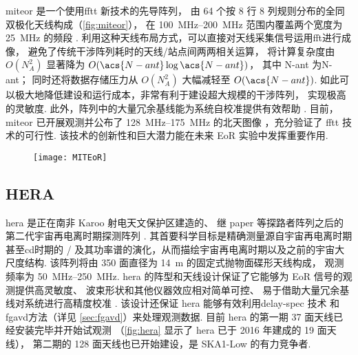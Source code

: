 \acf{miteor} 是一个使用\ac{fftt} 新技术\cite{tegmark2009,tegmark2010}的先导阵列，
由 64 个按 8 行 8 列规则分布的全同双极化天线构成（\autoref{fig:miteor}），
在 \SIrange{100}{200}{\MHz} 范围内覆盖两个宽度为 \SI{25}{\MHz} 的频段
\cite{zheng2014}.
利用这种天线布局方式，可以直接对天线采集信号运用\ac{fft}进行成像，
避免了传统干涉阵列耗时的天线/站点间两两相关运算，
将计算复杂度由 $O(N_{\!A}^2)$ 显著降为 $O(\acs{N-ant} \log\acs{N-ant})$，
其中 \acs{N-ant} 为\acl{N-ant}；
同时还将数据存储压力从 $O(N_{\!A}^2)$ 大幅减轻至 $O(\acs{N-ant})$.
如此可以极大地降低建设和运行成本，非常有利于建设超大规模的干涉阵列，
实现极高的灵敏度.
此外，阵列中的大量冗余基线能为系统自校准提供有效帮助 \cite{dillon2016}.
目前，\ac{miteor} 已开展观测并公布了 \SIrange{128}{175}{\MHz} 的北天图像
\cite{zheng2017}，充分验证了 \ac{fftt} 技术的可行性.
该技术的创新性和巨大潜力能在未来 EoR 实验中发挥重要作用.

\begin{figure}[htp]
  \centering
  \texttt{[image: MITEoR]}
  \label{fig:miteor}
\end{figure}

\subsection{HERA}

\acf{hera} 是正在南非 Karoo 射电天文保护区建造的、
继 \ac{paper} 等探路者阵列之后的第二代宇宙再电离时期探测阵列 \cite{deboer2017}.
其首要科学目标是精确测量源自宇宙再电离时期甚至\acl{cd}时期的 \hisignal/
及其功率谱的演化，从而描绘宇宙再电离时期以及之前的宇宙大尺度结构.
该阵列将由 350 面直径为 \SI{14}{\meter} 的固定式抛物面碟形天线构成，
观测频率为 \SIrange{50}{250}{\MHz}.
\acs{hera} 的阵型和天线设计保证了它能够为 EoR 信号的观测提供高灵敏度、
波束形状和其他仪器效应相对简单可控、
易于借助大量冗余基线对系统进行高精度校准 \cite{dillon2016}.
该设计还保证 \acs{hera} 能够有效利用\ac{delay-spec} 技术\cite{parsons2012}
和\acl{fgavd}方法（详见 \autoref{sec:fgavd}）来处理观测数据.
目前 \acs{hera} 的第一期 37 面天线已经安装完毕并开始试观测
（\autoref{fig:hera} 显示了 \acs{hera} 已于 2016 年建成的 19 面天线），
第二期的 128 面天线也已开始建设，是 SKA1-Low 的有力竞争者.

